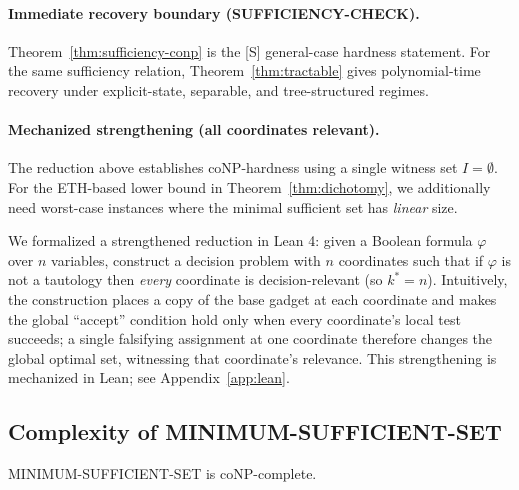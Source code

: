 \paragraph{Immediate recovery boundary (SUFFICIENCY-CHECK).}
Theorem~\ref{thm:sufficiency-conp} is the [S] general-case hardness statement. For the same sufficiency relation, Theorem~\ref{thm:tractable} gives polynomial-time recovery under explicit-state, separable, and tree-structured regimes.

\paragraph{Mechanized strengthening (all coordinates relevant).}
The reduction above establishes coNP-hardness using a single witness set $I=\emptyset$. For the ETH-based lower bound in Theorem~\ref{thm:dichotomy}, we additionally need worst-case instances where the minimal sufficient set has \emph{linear} size.

We formalized a strengthened reduction in Lean 4: given a Boolean formula $\varphi$ over $n$ variables, construct a decision problem with $n$ coordinates such that if $\varphi$ is not a tautology then \emph{every} coordinate is decision-relevant (so $k^* = n$). Intuitively, the construction places a copy of the base gadget at each coordinate and makes the global ``accept'' condition hold only when every coordinate's local test succeeds; a single falsifying assignment at one coordinate therefore changes the global optimal set, witnessing that coordinate's relevance. This strengthening is mechanized in Lean; see Appendix~\ref{app:lean}.

\subsection{Complexity of MINIMUM-SUFFICIENT-SET}

\begin{theorem}
\label{thm:minsuff-conp}
MINIMUM-SUFFICIENT-SET is coNP-complete.
\end{theorem}

